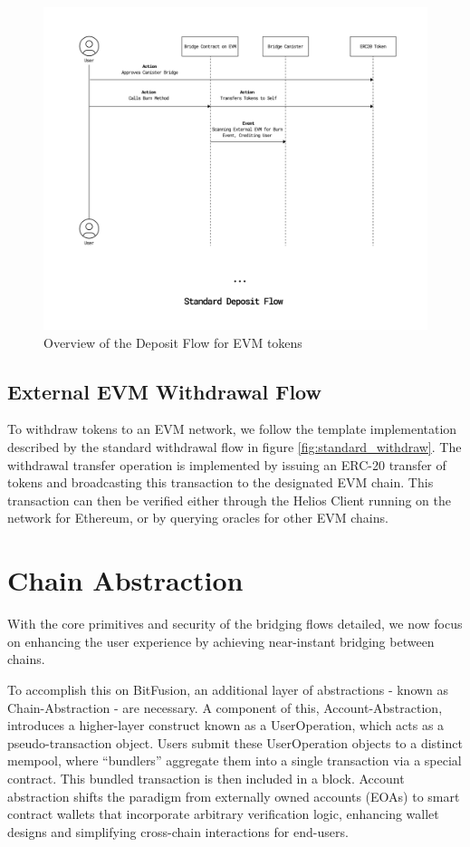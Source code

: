 \documentclass{article}
\begin{document}
\begin{figure}[H]
    \centering
    \includegraphics[width=1\textwidth]{evm.png}
    \caption{Overview of the Deposit Flow for EVM tokens}
    \label{fig:evm}
\end{figure}

\subsection{External EVM Withdrawal Flow}

 To withdraw tokens to an EVM network, we follow the template implementation described by the standard withdrawal flow in figure \ref{fig:standard_withdraw}. The withdrawal transfer operation is implemented by issuing an ERC-20 transfer of tokens and broadcasting this transaction to the designated EVM chain. This transaction can then be verified either through the Helios Client running on the network for Ethereum, or by querying oracles for other EVM chains. 


\section{Chain Abstraction}

With the core primitives and security of the bridging flows detailed, we now focus on enhancing the user experience by achieving near-instant bridging between chains.

To accomplish this on BitFusion, an additional layer of abstractions - known as Chain-Abstraction - are necessary. A component of this, Account-Abstraction, introduces a higher-layer construct known as a UserOperation, which acts as a pseudo-transaction object. Users submit these UserOperation objects to a distinct mempool, where ``bundlers'' aggregate them into a single transaction via a special contract. This bundled transaction is then included in a block. Account abstraction shifts the paradigm from externally owned accounts (EOAs) to smart contract wallets that incorporate arbitrary verification logic, enhancing wallet designs and simplifying cross-chain interactions for end-users.
\end{document}
